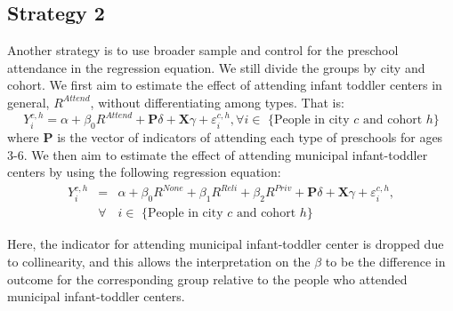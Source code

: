\begin{table}[H] \caption{Number of Individuals in Each Group} \label{tab:num-group}
\end{table}

\subsection{Strategy 2}
Another strategy is to use broader sample and control for the preschool attendance in the regression equation. We still divide the groups by city and cohort. We first aim to estimate the effect of attending infant toddler centers in general, $R^{Attend}$, without differentiating among types. That is:
\begin{equation}
Y_{i}^{c,h} = \alpha + \beta_{0}R^{Attend} + \mathbf{P}\delta + \mathbf{X}\gamma + \varepsilon_{i}^{c,h}, \forall i \in \text{ \{People in city $c$ and cohort $h$\}}
\end{equation}
where $\mathbf{P}$ is the vector of indicators of attending each type of preschools for ages 3-6. We then aim to estimate the effect of attending municipal infant-toddler centers by using the following regression equation:
\begin{eqnarray}
Y_{i}^{c,h} & = & \alpha + \beta_{0}R^{None} + \beta_{1}R^{Reli} + \beta_{2}R^{Priv} + \mathbf{P}\delta +  \mathbf{X}\gamma + \varepsilon_{i}^{c,h}, \\ \nonumber
& \forall & i \in \text{ \{People in city $c$ and cohort $h$\}}
\end{eqnarray}

Here, the indicator for attending municipal infant-toddler center is dropped due to collinearity, and this allows the interpretation on the $\beta$ to be the difference in outcome for the corresponding group relative to the people who attended municipal infant-toddler centers. 



